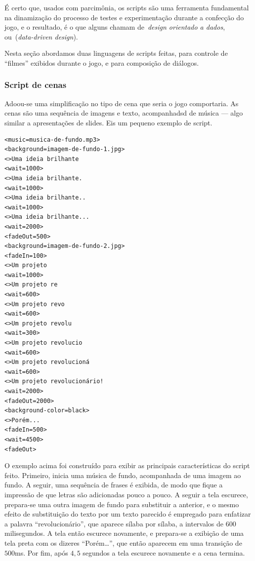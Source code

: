 É certo que, usados com parcimônia, os scripts são uma ferramenta
fundamental na dinamização do processo de testes e experimentação
durante a confecção do jogo, e o resultado, é o que alguns chamam
de~\emph{design orientado a dados}, ou~(\emph{data-driven design}).

Nesta seção abordamos duas linguagens de scripts feitas, para controle
de ``filmes'' exibidos durante o jogo, e para composição de diálogos.

\subsubsection{Script de cenas}

Adoou-se uma simplificação no tipo de cena que seria o jogo
comportaria. As cenas são uma sequência de imagens e texto,
acompanhadsd de música --- algo similar a apresentações de slides. Eis
um pequeno exemplo de script.

{\centering
\footnotesize
\begin{verbatim}
<music=musica-de-fundo.mp3>
<background=imagem-de-fundo-1.jpg>
<>Uma ideia brilhante
<wait=1000>
<>Uma ideia brilhante.
<wait=1000>
<>Uma ideia brilhante..
<wait=1000>
<>Uma ideia brilhante...
<wait=2000>
<fadeOut=500>
<background=imagem-de-fundo-2.jpg>
<fadeIn=100>
<>Um projeto
<wait=1000>
<>Um projeto re
<wait=600>
<>Um projeto revo
<wait=600>
<>Um projeto revolu
<wait=300>
<>Um projeto revolucio
<wait=600>
<>Um projeto revolucioná
<wait=600>
<>Um projeto revolucionário!
<wait=2000>
<fadeOut=2000>
<background-color=black>
<>Porém...
<fadeIn=500>
<wait=4500>
<fadeOut>
\end{verbatim}
}

O exemplo acima foi construído para exibir as principais
características do script feito. Primeiro, inicia uma música de fundo,
acompanhada de uma imagem ao fundo. A seguir, uma sequência de frases
é exibida, de modo que fique a impressão de que letras são adicionadas
pouco a pouco. A seguir a tela escurece, prepara-se uma outra imagem
de fundo para substituir a anterior, e o mesmo efeito de substituição
do texto por um texto parecido é empregado para enfatizar a palavra
``revolucionário'', que aparece sílaba por sílaba, a intervalos de
$600$ milisegundos. A tela então escurece novamente, e prepara-se a
exibição de uma tela preta com os dizeres ``Porém\ldots'', que então
aparecem em uma transição de $500$ms. Por fim, após $4,5$ segundos a
tela escurece novamente e a cena termina.

